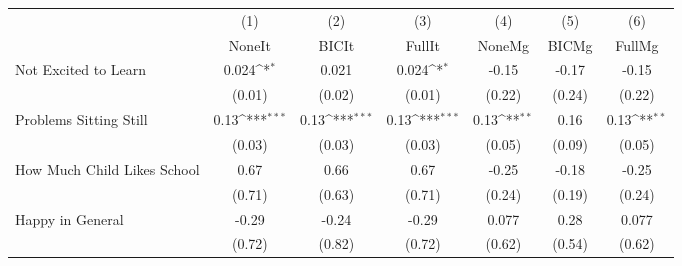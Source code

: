 {
\def\sym#1{\ifmmode^{#1}\else\(^{#1}\)\fi}
\begin{tabular}{l*{6}{c}}
\toprule
            &\multicolumn{1}{c}{(1)}&\multicolumn{1}{c}{(2)}&\multicolumn{1}{c}{(3)}&\multicolumn{1}{c}{(4)}&\multicolumn{1}{c}{(5)}&\multicolumn{1}{c}{(6)}\\
            &\multicolumn{1}{c}{NoneIt}&\multicolumn{1}{c}{BICIt}&\multicolumn{1}{c}{FullIt}&\multicolumn{1}{c}{NoneMg}&\multicolumn{1}{c}{BICMg}&\multicolumn{1}{c}{FullMg}\\
\midrule
Not Excited to Learn&       0.024\sym{*}  &       0.021         &       0.024\sym{*}  &       -0.15         &       -0.17         &       -0.15         \\
            &      (0.01)         &      (0.02)         &      (0.01)         &      (0.22)         &      (0.24)         &      (0.22)         \\
\addlinespace
Problems Sitting Still&        0.13\sym{***}&        0.13\sym{***}&        0.13\sym{***}&        0.13\sym{**} &        0.16         &        0.13\sym{**} \\
            &      (0.03)         &      (0.03)         &      (0.03)         &      (0.05)         &      (0.09)         &      (0.05)         \\
\addlinespace
How Much Child Likes School&        0.67         &        0.66         &        0.67         &       -0.25         &       -0.18         &       -0.25         \\
            &      (0.71)         &      (0.63)         &      (0.71)         &      (0.24)         &      (0.19)         &      (0.24)         \\
\addlinespace
Happy in General&       -0.29         &       -0.24         &       -0.29         &       0.077         &        0.28         &       0.077         \\
            &      (0.72)         &      (0.82)         &      (0.72)         &      (0.62)         &      (0.54)         &      (0.62)         \\
\bottomrule
\end{tabular}
}
